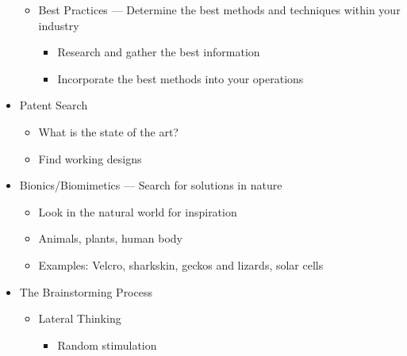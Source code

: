 \begin{itemize}
\begin{itemize}
      \item Best Practices — Determine the best methods and techniques within your industry

        \begin{itemize}

          \item Research and gather the best information

          \item Incorporate the best methods into your operations

        \end{itemize}

    \end{itemize}

  \item Patent Search

    \begin{itemize}

      \item What is the state of the art?

      \item Find working designs

    \end{itemize}

  \item Bionics/Biomimetics — Search for solutions in nature

    \begin{itemize}

      \item Look in the natural world for inspiration

      \item Animals, plants, human body

      \item Examples: Velcro, sharkskin, geckos and lizards, solar cells

    \end{itemize}

  \item The Brainstorming Process

    \begin{itemize}

      \item Lateral Thinking

        \begin{itemize}

          \item Random stimulation


\end{itemize}
\end{itemize}
\end{itemize}
